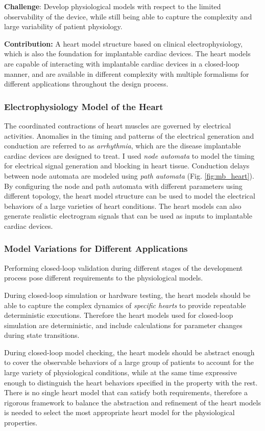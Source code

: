 \documentclass[a4paper,11pt]{article}
\begin{document}
\noindent \textbf{Challenge}: Develop physiological models with respect to the limited observability of the device, while still being able to capture the complexity and large variability of patient physiology.

\noindent \textbf{Contribution:} A heart model structure based on clinical electrophysiology, which is also the foundation for implantable cardiac devices.
The heart models are capable of interacting with implantable cardiac devices in a closed-loop manner, and are available in different complexity with multiple formalisms for different applications throughout the design process.
\subsubsection{Electrophysiology Model of the Heart}
The coordinated contractions of heart muscles are governed by electrical activities.
Anomalies in the timing and patterns of the electrical generation and conduction are referred to as \emph{arrhythmia}, which are the disease implantable cardiac devices are designed to treat.
I used \emph{node automata} to model the timing for electrical signal generation and blocking in heart tissue.
Conduction delays between node automata are modeled using \emph{path automata} (Fig. \ref{fig:mb_heart}).
By configuring the node and path automata with different parameters using different topology, the heart model structure can be used to model the electrical behaviors of a large varieties of heart conditions. 
The heart models can also generate realistic electrogram signals that can be used as inputs to implantable cardiac devices.

\subsubsection{Model Variations for Different Applications}
Performing closed-loop validation during different stages of the development process pose different requirements to the physiological models.

During closed-loop simulation or hardware testing, the heart models should be able to capture the complex dynamics of \emph{specific hearts} to provide repeatable deterministic executions.
Therefore the heart models used for closed-loop simulation are deterministic, and include calculations for parameter changes during state transitions.

During closed-loop model checking, the heart models should be abstract enough to cover the observable behaviors of a large group of patients to account for the large variety of physiological conditions, while at the same time expressive enough to distinguish the heart behaviors specified in the property with the rest.
There is no single heart model that can satisfy both requirements, therefore a rigorous framework to balance the abstraction and refinement of the heart models is needed to select the most appropriate heart model for the physiological properties.
\end{document}
